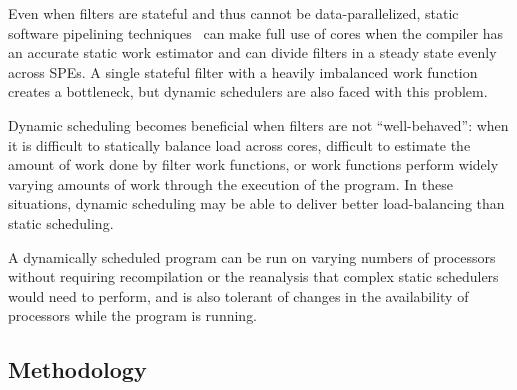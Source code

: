 Even when filters are stateful and thus cannot be data-parallelized,
static software pipelining techniques~\cite{asplos06} can make full
use of cores when the compiler has an accurate static work estimator
and can divide filters in a steady state evenly across
SPEs. A single stateful filter with a heavily imbalanced work
function creates a bottleneck, but dynamic schedulers are also faced
with this problem. 

Dynamic scheduling becomes beneficial when filters are not
``well-behaved'': when it is difficult to statically balance load
across cores, difficult to estimate the amount of work done by filter
work functions, or work functions perform widely varying amounts of
work through the execution of the program. In these situations,
dynamic scheduling may be able to deliver better load-balancing than
static scheduling.

A dynamically scheduled program can be run on varying numbers of
processors without requiring recompilation or the reanalysis that
complex static schedulers would need to perform, and is also tolerant
of changes in the availability of processors while the program is
running. 



\subsection{Methodology}

